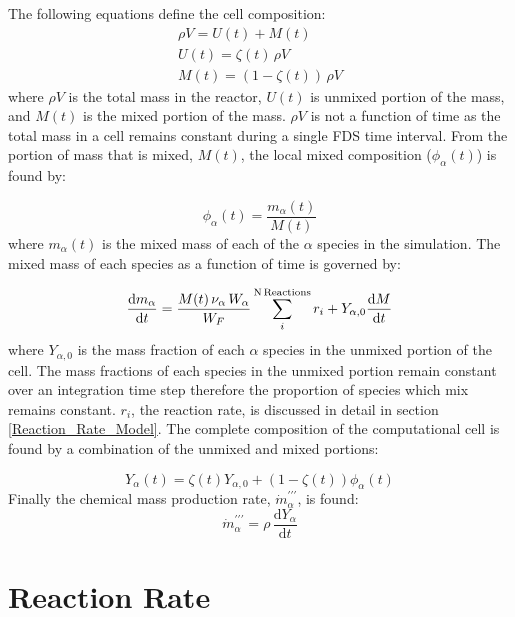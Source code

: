 The following equations define the cell composition:
\begin{eqnarray}\label{eq:mixunmix}
\rho V = U(t) + M(t) \\
U(t) = \zeta(t)\,\rho V \\
M(t) = (1-\zeta(t))\,\rho V
\end{eqnarray} 
where $\rho V$ is the total mass in the reactor, $U(t)$ is unmixed portion of the mass, and $M(t)$ is the mixed portion of the mass. $\rho V$ is not a function of time as the total mass in a cell remains constant during a single FDS time interval. From the portion of mass that is mixed, $M(t)$, the local mixed composition ($\phi_{\alpha}(t)$) is found by:

\begin{equation}\label{eq:phi}
\phi_{\alpha}(t)=\frac{m_{\alpha}(t)}{M(t)}
\end{equation}
where $m_\alpha(t)$ is the mixed mass of each of the $\alpha$ species in the simulation. The mixed mass of each species as a function of time is governed by:

\begin{equation}\label{eq:mixmass}
\frac{\mbox{d}m_{\alpha}}{\mbox{d}t}=\frac{M(t) \, \nu_{\alpha} \, W_{\alpha}}{W_F}\displaystyle \sum_{i}^{\text{N\,Reactions}}r_{i}+Y_{\alpha,0}\frac{\mbox{d}M}{\mbox{d}t} 
\end{equation}
where $Y_{\alpha,0}$ is the mass fraction of each $\alpha$ species in the unmixed portion of the cell. The mass fractions of each species in the unmixed portion remain constant over an integration time step therefore the proportion of species which mix remains constant. $r_{i}$, the reaction rate, is discussed in detail in section \ref{Reaction_Rate_Model}. The complete composition of the computational cell is found by a combination of the unmixed and mixed portions:

\begin{equation}\label{eq:final_comp}
Y_{\alpha}(t)=\zeta(t)Y_{\alpha,0}+(1-\zeta(t))\phi_{\alpha}(t)
\end{equation}
Finally the chemical mass production rate, $\dot{m}^{\prime\prime\prime}_{\alpha}$, is found:
\begin{equation}\label{mass_prod_rate}
\dot{m}^{\prime\prime\prime}_{\alpha}=\rho \,\frac{\mbox{d}Y_{\alpha}}{\mbox{d}t}
\end{equation}

\section{Reaction Rate} 

